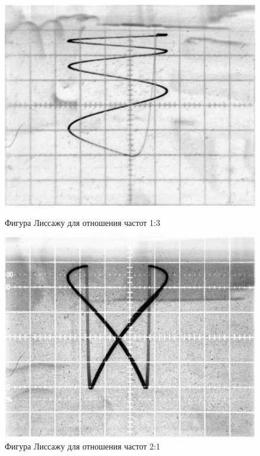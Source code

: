 \documentclass[a4paper,12pt]{article} %
\begin{document}
\begin{figure}[h]
\begin{center}
\begin{minipage}[h]{0.49\textwidth}
\includegraphics[width=\textwidth]{1-3.jpg}
\caption{Фигура Лиссажу для отношения частот 1:3} 
\label{fig:lis13}
\hfill
\end{minipage}
\begin{minipage}[h]{0.49\textwidth}
\includegraphics[width=\textwidth]{2-1.jpg}
\caption{Фигура Лиссажу для отношения частот 2:1}
\label{fig:lis21}
\hfill
\end{minipage}


\end{center}
\end{figure}
\end{document}
